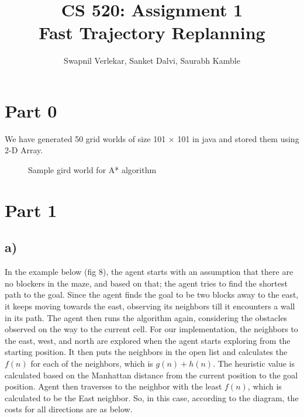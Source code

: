 \documentclass{article}
\title{CS 520: Assignment 1 \\
\large Fast Trajectory Replanning}
\author{Swapnil Verlekar, Sanket Dalvi, Saurabh Kamble}
\begin{document}
\maketitle

\section*{Part 0}

We have generated 50 grid worlds of size 101 × 101 in java and stored them using 2-D Array.

\begin{figure}[!ht]
    \centering
    \caption{Sample gird world for A* algorithm}
    \label{fig:my_label}
\end{figure}

\section*{Part 1}

\subsection*{a)}  
In the example below (fig 8), the agent starts with an assumption that there are no blockers in the maze, and based on that; the agent tries to find the shortest path to the goal. Since the agent finds the goal to be two blocks away to the east, it keeps moving towards the east, observing its neighbors till it encounters a wall in its path. The agent then runs the algorithm again, considering the obstacles observed on the way to the current cell. 
For our implementation, the neighbors to the east, west, and north are explored when the agent starts exploring from the starting position. It then puts the neighbors in the open list and calculates the $f(n)$ for each of the neighbors, which is $g(n) + h(n)$. The heuristic value is calculated based on the Manhattan distance from the current position to the goal position. 
Agent then traverses to the neighbor with the least $f(n)$, which is calculated to be the East neighbor.
So, in this case, according to the diagram, the costs for all directions are as below.
\end{document}
